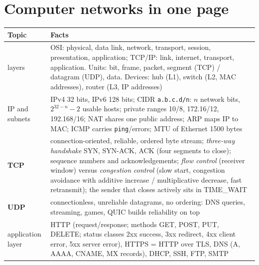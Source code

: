 \documentclass[10pt,a4paper,openany,oneside]{report}
\newcommand{\prio}[1]{\texorpdfstring{\ifcase#1\or{\color{gold}\ding{72}}\or{\color{gold}\ding{72}\ding{72}}\or{\color{gold}\ding{72}\ding{72}\ding{72}}\fi}{}}
\begin{document}
\section{Computer networks in one page \prio{1}}
\begin{center}\small
\begin{xltabular}{\textwidth}{@{}L{3.2cm}Y@{}}
\toprule
\textbf{Topic} & \textbf{Facts}\\
\midrule\endhead
layers & OSI: physical, data link, network, transport, session, presentation, application; TCP/IP: link, internet, transport, application. Units: bit, frame, packet, segment (TCP) / datagram (UDP), data. Devices: hub (L1), switch (L2, MAC addresses), router (L3, IP addresses)\\
IP and subnets & IPv4 32 bits, IPv6 128 bits; CIDR \texttt{a.b.c.d/n}: $n$ network bits, $2^{32-n}-2$ usable hosts; private ranges 10/8, 172.16/12, 192.168/16; NAT shares one public address; ARP maps IP to MAC; ICMP carries \texttt{ping}/errors; MTU of Ethernet 1500 bytes\\
\textbf{TCP} & connection-oriented, reliable, ordered byte stream; \emph{three-way handshake} SYN, SYN-ACK, ACK (four segments to close); sequence numbers and acknowledgements; \emph{flow control} (receiver window) versus \emph{congestion control} (slow start, congestion avoidance with additive increase / multiplicative decrease, fast retransmit); the sender that closes actively sits in TIME\_WAIT\\
\textbf{UDP} & connectionless, unreliable datagrams, no ordering: DNS queries, streaming, games, QUIC builds reliability on top\\
application layer & HTTP (request/response; methods GET, POST, PUT, DELETE; status classes 2xx success, 3xx redirect, 4xx client error, 5xx server error), HTTPS = HTTP over TLS, DNS (A, AAAA, CNAME, MX records), DHCP, SSH, FTP, SMTP\\
\bottomrule
\end{xltabular}
\end{center}
\end{document}

